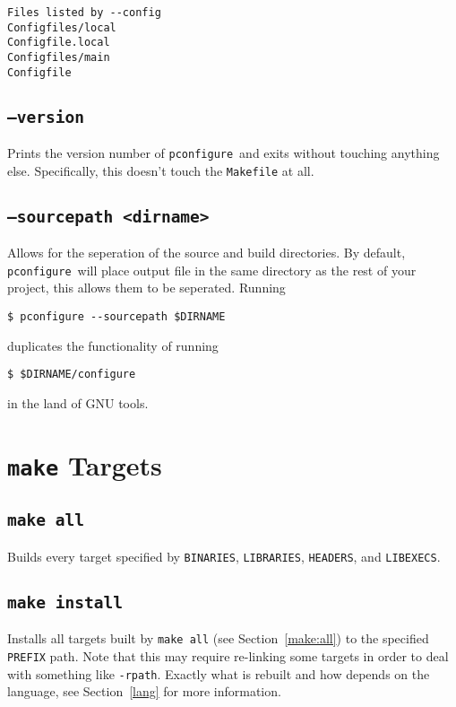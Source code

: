 \documentclass{article}
\newcommand{\pconfigure}{\texttt{pconfigure}}
\begin{document}
\begin{verbatim}
Files listed by --config
Configfiles/local
Configfile.local
Configfiles/main
Configfile
\end{verbatim}

\subsection{\texttt{--version}}

Prints the version number of \pconfigure\ and exits without touching
anything else.  Specifically, this doesn't touch the \texttt{Makefile}
at all.

\subsection{\texttt{--sourcepath <dirname>}}

Allows for the seperation of the source and build directories.  By
default, \pconfigure\ will place output file in the same directory as
the rest of your project, this allows them to be seperated.  Running
\begin{verbatim}
$ pconfigure --sourcepath $DIRNAME
\end{verbatim}
duplicates the functionality of running
\begin{verbatim}
$ $DIRNAME/configure
\end{verbatim}
in the land of GNU tools.

\section{\texttt{make} Targets \label{make}}

\subsection{\texttt{make all} \label{make:all}}

Builds every target specified by \texttt{BINARIES},
\texttt{LIBRARIES}, \texttt{HEADERS}, and \texttt{LIBEXECS}.

\subsection{\texttt{make install} \label{make:install}}

Installs all targets built by \texttt{make all} (see
Section~\ref{make:all}) to the specified \texttt{PREFIX} path.  Note
that this may require re-linking some targets in order to deal with
something like \texttt{-rpath}.  Exactly what is rebuilt and how
depends on the language, see Section~\ref{lang} for more information.
\end{document}
